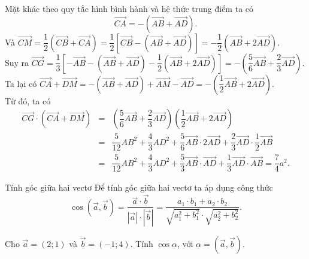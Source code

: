 \begin{vd}
{\begin{enumerate}
			Mặt khác theo quy tắc hình bình hành và hệ thức trung điểm ta có $$\overrightarrow{CA}=-\left(\overrightarrow{AB}+\overrightarrow{AD}\right).$$
			Và
			$\overrightarrow{CM}=\dfrac{1}{2}\left(\overrightarrow{CB}+\overrightarrow{CA}\right)=\dfrac{1}{2}\left[\overrightarrow{CB}-\left(\overrightarrow{AB}+\overrightarrow{AD}\right)\right]=-\dfrac{1}{2}\left(\overrightarrow{AB}+2\overrightarrow{AD}\right)$.
			\\
			Suy ra
			$\overrightarrow{CG}=\dfrac{1}{3}[-\overrightarrow{AB}-\left(\overrightarrow{AB}+\overrightarrow{AD}\right)-\dfrac{1}{2}\left(\overrightarrow{AB}+2\overrightarrow{AD}\right)]=-\left(\dfrac{5}{6}\overrightarrow{AB}+\dfrac{2}{3}\overrightarrow{AD}\right)$.
			\\
			Ta lại có
			$\overrightarrow{CA}+\overrightarrow{DM}=-\left(\overrightarrow{AB}+\overrightarrow{AD}\right)+\overrightarrow{AM}-\overrightarrow{AD}=-\left(\dfrac{1}{2}\overrightarrow{AB}+2\overrightarrow{AD}\right)$.
			\\
			Từ đó, ta có
			\begin{eqnarray*} \overrightarrow{CG}\cdot\left(\overrightarrow{CA}+\overrightarrow{DM}\right)&=&\left(\dfrac{5}{6}\overrightarrow{AB}+\dfrac{2}{3}\overrightarrow{AD}\right)\left(\dfrac{1}{2}\overrightarrow{AB}+2\overrightarrow{AD}\right) \\ &=&\dfrac{5}{12}AB^2+\dfrac{4}{3}AD^2+\dfrac{5}{6}\overrightarrow{AB}\cdot2\overrightarrow{AD}+\dfrac{2}{3}\overrightarrow{AD}\cdot\dfrac{1}{2}\overrightarrow{AB} \\
				&=& \dfrac{5}{12}AB^2+\dfrac{4}{3}AD^2+\dfrac{5}{3}\overrightarrow{AB}\cdot\overrightarrow{AD}+\dfrac{1}{3}\overrightarrow{AD}\cdot\overrightarrow{AB}=\dfrac{7}{4}a^2.
			\end{eqnarray*}
		\end{enumerate}
	}
\end{vd}

\begin{dang}{Tính góc giữa hai vectơ}
	Để tính góc giữa hai vectơ ta áp dụng công thức
	$$\cos \left(\overrightarrow{a}, \overrightarrow{b}\right) = \dfrac{\overrightarrow{a}\cdot \overrightarrow{b}}{\left|\overrightarrow{a}\right|\cdot \left|\overrightarrow{b}\right|} = \dfrac{a_1\cdot b_1 + a_2\cdot b_2}{\sqrt{a_1^2+b_1^2}\cdot \sqrt{a_2^2+b_2^2}}.$$
\end{dang}

\begin{vd}%
	Cho $\overrightarrow{a}=(2; 1)$ và $\overrightarrow{b}=(-1;4)$. Tính $\cos \alpha$, với $\alpha =\left(\overrightarrow{a}, \overrightarrow{b}\right)$.
\end{vd}

